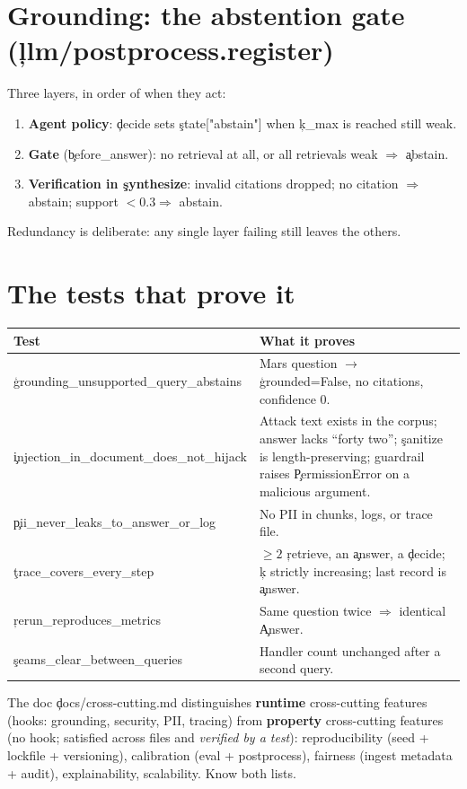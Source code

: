 \section{Grounding: the abstention gate (\c{llm/postprocess.register})}
Three layers, in order of when they act:
\begin{enumerate}
 \item \textbf{Agent policy}: \c{decide} sets \c{state["abstain"]} when \c{k\_max} is reached still weak.
 \item \textbf{Gate} (\c{before\_answer}): no retrieval at all, or all retrievals weak $\Rightarrow$ \c{abstain}.
 \item \textbf{Verification in \c{synthesize}}: invalid citations dropped; no citation $\Rightarrow$ abstain; support $<0.3\Rightarrow$ abstain.
\end{enumerate}
Redundancy is deliberate: any single layer failing still leaves the others.

\section{The tests that prove it}
\begin{center}\begin{tabular}{@{}p{5.5cm}p{9cm}@{}}\toprule Test & What it proves \\ \midrule
\c{grounding\_unsupported\_query\_abstains} & Mars question $\to$ \c{grounded=False}, no citations, confidence $0$. \\
\c{injection\_in\_document\_does\_not\_hijack} & Attack text exists in the corpus; answer lacks ``forty two''; \c{sanitize} is length-preserving; guardrail raises \c{PermissionError} on a malicious argument. \\
\c{pii\_never\_leaks\_to\_answer\_or\_log} & No PII in chunks, logs, or trace file. \\
\c{trace\_covers\_every\_step} & $\ge2$ \c{retrieve}, an \c{answer}, a \c{decide}; \c{k} strictly increasing; last record is \c{answer}. \\
\c{rerun\_reproduces\_metrics} & Same question twice $\Rightarrow$ identical \c{Answer}. \\
\c{seams\_clear\_between\_queries} & Handler count unchanged after a second query. \\
\bottomrule\end{tabular}\end{center}
\begin{tip}
The doc \c{docs/cross-cutting.md} distinguishes \textbf{runtime} cross-cutting features (hooks: grounding, security, PII, tracing) from \textbf{property} cross-cutting features (no hook; satisfied across files and \emph{verified by a test}): reproducibility (seed + lockfile + versioning), calibration (eval + postprocess), fairness (ingest metadata + audit), explainability, scalability. Know both lists.
\end{tip}
